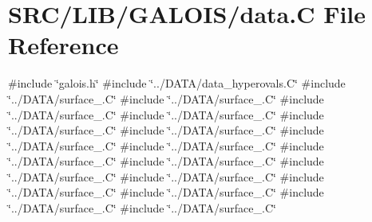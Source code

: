 \hypertarget{data_8_c}{}\section{S\+R\+C/\+L\+I\+B/\+G\+A\+L\+O\+I\+S/data.C File Reference}
\label{data_8_c}
{\ttfamily \#include \char`\"{}galois.\+h\char`\"{}}\newline
{\ttfamily \#include \char`\"{}../\+D\+A\+T\+A/data\+\_\+hyperovals.\+C\char`\"{}}\newline
{\ttfamily \#include \char`\"{}../\+D\+A\+T\+A/surface\+\_.\+C\char`\"{}}\newline
{\ttfamily \#include \char`\"{}../\+D\+A\+T\+A/surface\+\_.\+C\char`\"{}}\newline
{\ttfamily \#include \char`\"{}../\+D\+A\+T\+A/surface\+\_.\+C\char`\"{}}\newline
{\ttfamily \#include \char`\"{}../\+D\+A\+T\+A/surface\+\_.\+C\char`\"{}}\newline
{\ttfamily \#include \char`\"{}../\+D\+A\+T\+A/surface\+\_.\+C\char`\"{}}\newline
{\ttfamily \#include \char`\"{}../\+D\+A\+T\+A/surface\+\_.\+C\char`\"{}}\newline
{\ttfamily \#include \char`\"{}../\+D\+A\+T\+A/surface\+\_.\+C\char`\"{}}\newline
{\ttfamily \#include \char`\"{}../\+D\+A\+T\+A/surface\+\_.\+C\char`\"{}}\newline
{\ttfamily \#include \char`\"{}../\+D\+A\+T\+A/surface\+\_.\+C\char`\"{}}\newline
{\ttfamily \#include \char`\"{}../\+D\+A\+T\+A/surface\+\_.\+C\char`\"{}}\newline
{\ttfamily \#include \char`\"{}../\+D\+A\+T\+A/surface\+\_.\+C\char`\"{}}\newline
{\ttfamily \#include \char`\"{}../\+D\+A\+T\+A/surface\+\_.\+C\char`\"{}}\newline
{\ttfamily \#include \char`\"{}../\+D\+A\+T\+A/surface\+\_.\+C\char`\"{}}\newline
{\ttfamily \#include \char`\"{}../\+D\+A\+T\+A/surface\+\_.\+C\char`\"{}}\newline
{\ttfamily \#include \char`\"{}../\+D\+A\+T\+A/surface\+\_.\+C\char`\"{}}\newline
{\ttfamily \#include \char`\"{}../\+D\+A\+T\+A/surface\+\_.\+C\char`\"{}}\newline
